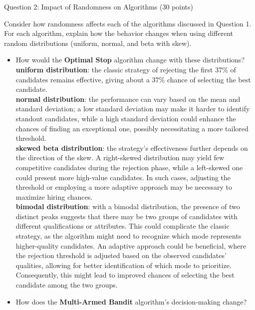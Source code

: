 \documentclass[12pt]{exam}
\begin{document}
\begin{questions}
\question[40] Question 2: Impact of Randomness on Algorithms (30 points)

Consider how randomness affects each of the algorithms discussed in Question 1. For each algorithm, explain how the behavior changes when using different random distributions (uniform, normal, and beta with skew).

\begin{itemize}
    \item How would the \textbf{Optimal Stop} algorithm change with these distributions?\\

    \textbf{uniform distribution}: the classic strategy of rejecting the first 37\% of candidates remains effective, giving about a 37\% chance of selecting the best candidate. \\
    
    \textbf{normal distribution}: the performance can vary based on the mean and standard deviation; a low standard deviation may make it harder to identify standout candidates, while a high standard deviation could enhance the chances of finding an exceptional one, possibly necessitating a more tailored threshold. \\
    
    \textbf{skewed beta distribution}: the strategy's effectiveness further depends on the direction of the skew. A right-skewed distribution may yield few competitive candidates during the rejection phase, while a left-skewed one could present more high-value candidates. In such cases, adjusting the threshold or employing a more adaptive approach may be necessary to maximize hiring chances. \\

    \textbf{bimodal distribution}: with a bimodal distribution, the presence of two distinct peaks suggests that there may be two groups of candidates with different qualifications or attributes. This could complicate the classic strategy, as the algorithm might need to recognize which mode represents higher-quality candidates. An adaptive approach could be beneficial, where the rejection threshold is adjusted based on the observed candidates’ qualities, allowing for better identification of which mode to prioritize. Consequently, this might lead to improved chances of selecting the best candidate among the two groups. \\
    

    \item How does the \textbf{Multi-Armed Bandit} algorithm's decision-making change?\\


\end{itemize}
\end{questions}
\end{document}
